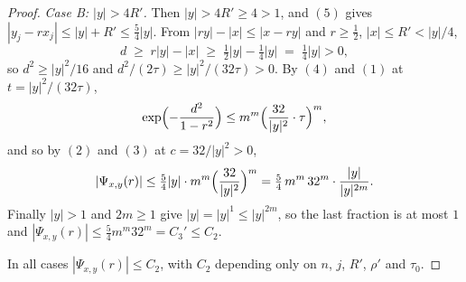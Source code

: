 \begin{proof}
\emph{Case B: $|y| > 4R'$.}  Then $|y| > 4R' \geq 4 > 1$, and $(5)$ gives
$|y_j-rx_j| \leq |y| + R' \leq \tfrac54|y|$.  From $|ry| - |x| \leq |x-ry|$ and
$r \geq \tfrac12$, $|x| \leq R' < |y|/4$,
\[
  d \;\geq\; r|y| - |x| \;\geq\; \tfrac12|y| - \tfrac14|y| \;=\; \tfrac14|y| > 0 ,
\]
so $d^2 \geq |y|^2/16$ and $d^2/(2\tau) \geq |y|^2/(32\tau) > 0$.  By $(4)$ and
$(1)$ at $t = |y|^2/(32\tau)$,
\[
  \exp\Bigl(-\frac{d^2}{1-r^2}\Bigr)
    \leq m^m\Bigl(\frac{32}{|y|^2}\cdot\tau\Bigr)^{m} ,
\]
and so by $(2)$ and $(3)$ at $c = 32/|y|^2 > 0$,
\[
  |\Psi_{x,y}(r)|
    \leq \tfrac54|y|\cdot m^m\Bigl(\frac{32}{|y|^2}\Bigr)^{m}
    = \tfrac54\,m^m\,32^{m}\cdot\frac{|y|}{|y|^{2m}} .
\]
Finally $|y| > 1$ and $2m \geq 1$ give $|y| = |y|^1 \leq |y|^{2m}$, so the last
fraction is at most $1$ and
$|\Psi_{x,y}(r)| \leq \tfrac54m^m32^m = C_3' \leq C_2$.

In all cases $|\Psi_{x,y}(r)| \leq C_2$, with $C_2$ depending only on $n$, $j$,
$R'$, $\rho'$ and $\tau_0$.
\end{proof}
